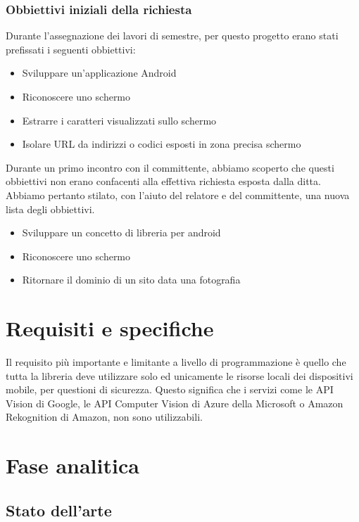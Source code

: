 \documentclass[twoside]{supsistudent}
\begin{document}
\subsection{Obbiettivi iniziali della richiesta}
Durante l’assegnazione dei lavori di semestre, per questo progetto erano stati prefissati i seguenti obbiettivi:

\begin{itemize}
\item Sviluppare un'applicazione Android
\item Riconoscere uno schermo
\item Estrarre i caratteri visualizzati sullo schermo
\item Isolare URL da indirizzi o codici esposti in zona precisa schermo
\end{itemize}

Durante un primo incontro con il committente, abbiamo scoperto che questi obbiettivi non erano confacenti alla effettiva richiesta esposta dalla ditta. Abbiamo pertanto stilato, con l’aiuto del relatore e del committente, una nuova lista degli obbiettivi.

\begin{itemize}
\item Sviluppare un concetto di libreria per android
\item Riconoscere uno schermo
\item Ritornare il dominio di un sito data una fotografia
\end{itemize}

\chapter{Requisiti e specifiche} 
Il requisito più importante e limitante a livello di programmazione è quello che tutta la libreria deve utilizzare solo ed unicamente le risorse locali dei dispositivi mobile, per questioni di sicurezza. Questo significa che i servizi come le API Vision di Google, le API Computer Vision di Azure della Microsoft o Amazon Rekognition di Amazon, non sono utilizzabili.  

\chapter{Fase analitica}
\section{Stato dell'arte} %
\end{document}
